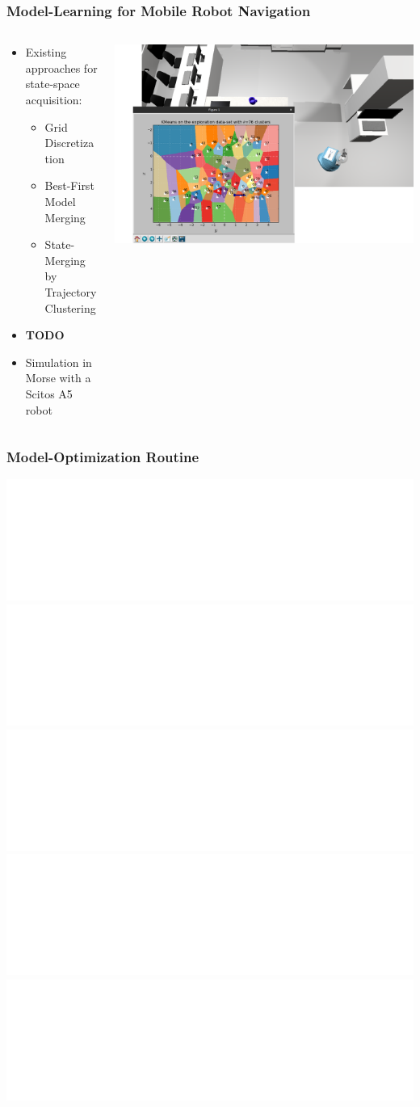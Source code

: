 \begin{frame}
\frametitle{Model-Learning for Mobile Robot Navigation}

\begin{columns}[T]
\begin{column}{0.6\textwidth}
\begin{itemize}
	\item Existing approaches for state-space acquisition:
	\begin{itemize}
		\item Grid Discretization
		\item Best-First Model Merging %
		\item State-Merging by Trajectory Clustering %
	\end{itemize}
	\item \textbf{TODO}
	\item Simulation in Morse with a Scitos A5 robot
\end{itemize}
\end{column}
\begin{column}{0.5\textwidth}
\includegraphics[width=\textwidth, left]{figures/simulation_learn_2}
\end{column}
\end{columns}	
	
\end{frame}

\begin{frame}
\frametitle{Model-Optimization Routine}
\begin{center}
\includegraphics<1| handout:0>[width=1\textwidth]{figures/optimization-routine/learning-cycle-1.pdf}
\includegraphics<2| handout:0>[width=1\textwidth]{figures/optimization-routine/learning-cycle-2.pdf}
\includegraphics<3| handout:0>[width=1\textwidth]{figures/optimization-routine/learning-cycle-3.pdf}
\includegraphics<4| handout:0>[width=1\textwidth]{figures/optimization-routine/learning-cycle-4.pdf}
\includegraphics<5>[width=1\textwidth]{figures/optimization-routine/learning-cycle-5.pdf}
\end{center}
\end{frame}

